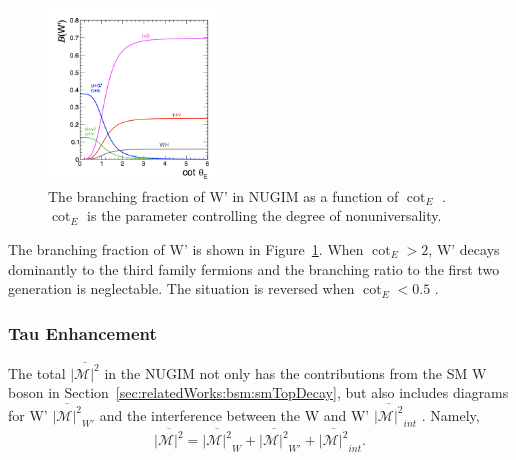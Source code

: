 \begin{figure}[ht]
    \centering
    \includegraphics[width=0.4\textwidth]{chapters/RelatedWorks/sectionBSM/figures/WPDecayBr.png}
    \caption{The branching fraction of W' in NUGIM as a function of $\cot_E$ \cite{Sirunyan:2018lbg}. $\cot_E$ is the parameter controlling the degree of nonuniversality.}
    \label{fig:relatedWorks:bsm:WPrime:braching}
\end{figure}



\noindent The branching fraction of W' is shown in Figure~\ref{fig:relatedWorks:bsm:WPrime:braching}. When $\cot_E > 2$, W' decays dominantly to the third family fermions and the branching ratio to the first two generation is neglectable. The situation is reversed when $\cot_E<0.5$ .


\subsubsection{Tau Enhancement}

The total $ \overline{ |\mathcal{M}|^2 }  $ in the NUGIM not only has the contributions from the SM W boson in Section~\ref{sec:relatedWorks:bsm:smTopDecay}, but also includes diagrams for W' $\overline{ |\mathcal{M}|^2 } _{W'} $  and the interference between the W and W' $\overline{ |\mathcal{M}|^2 } _{int} $ . Namely,
\begin{equation}
	\overline{ |\mathcal{M}|^2 }  = \overline{ |\mathcal{M}|^2 } _{W} +  \overline{ |\mathcal{M}|^2 } _{W'} +  \overline{ |\mathcal{M}|^2 } _{int} .
\end{equation}

